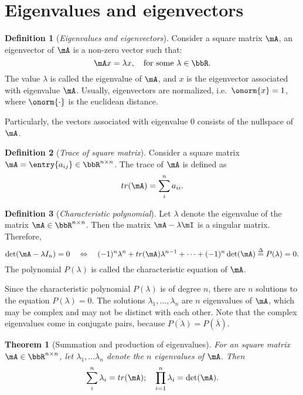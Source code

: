 \documentclass[11pt]{article}
\theoremstyle{plain}
\newtheorem{thm}{Theorem}[section]
\theoremstyle{definition}
\newtheorem{defn}{Definition}
\begin{document}
\section{Eigenvalues and eigenvectors}
\begin{defn}[\textit{Eigenvalues and eigenvectors}]\label{def:eigen}
	Consider a square matrix $\mA$, an eigenvector of $\mA$ is a non-zero vector such that:
	\[ \mA x = \lambda x, \quad \text{for some } \lambda \in \bbR. \]
	The value $\lambda$ is called the eigenvalue of $\mA$, and $x$ is the eigenvector associated with eigenvalue $\mA$. Usually, eigenvectors are normalized, i.e.\ $\onorm{x} = 1$, where $\onorm{\cdot}$ is the euclidean distance.
	
	Particularly, the vectors associated with eigenvalue 0 consists of the nullspace of $\mA$.
\end{defn}

\begin{defn}[\textit{Trace of square matrix}]\label{def:trace}
Consider a square matrix $\mA = \entry{a_{ij}} \in \bbR^{n \times n}$. The trace of $\mA$ is defined as
\[ tr(\mA) = \sum_{i}^n a_{ii}.\] 
\end{defn}

\begin{defn}[\textit{Characteristic polynomial}]\label{def:charac}
	Let $\lambda$ denote the eigenvalue of the matrix $\mA\in \bbR^{n \times n}$. Then the matrix $\mA - \lambda \mI$ is a singular matrix. Therefore,
	\[ \det(\mA - \lambda I_n) = 0 \quad  \Leftrightarrow \quad (-1)^n \lambda^n + tr(\mA)\lambda^{n-1} + \cdots + (-1)^n \det(\mA) \overset{\Delta}{=} P(\lambda) = 0.   \]
	 The polynomial $P(\lambda)$ is called the characteristic equation of $\mA$. 
\end{defn}

Since the characteristic polynomial $P(\lambda)$ is of degree $n$, there are $n$ solutions to the equation $P(\lambda) = 0$. The solutions $\lambda_1,...,\lambda_n$ are $n$ eigenvalues of $\mA$, which may be complex and may not be distinct with each other. Note that the complex eigenvalues come in conjugate pairs, because $\overline{ P(\lambda)} = P(\overline{ \lambda})$. 

\begin{thm}[Summation and production of eigenvalues]\label{thm:speigen}
	For an square matrix $\mA \in \bbR^{n \times n}$, let $\lambda_1,...\lambda_n$ denote the $n$ eigenvalues of $\mA$. Then 
	\begin{equation}
		\sum_{i}^n \lambda_i = tr(\mA); \quad \prod_{i=1}^n \lambda_i = \det(\mA).
	\end{equation} 
\end{thm}
\end{document}
